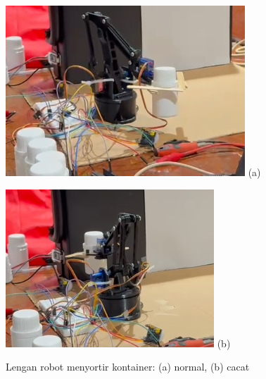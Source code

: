 \begin{figure}[H]
  \centering
  \begin{minipage}[t]{0.48\textwidth}
    \centering
    \includegraphics[width=\textwidth]{gambar/robot_normal.jpeg}
    (a)
  \end{minipage}
  \hfill
  \begin{minipage}[t]{0.48\textwidth}
    \centering
    \includegraphics[width=\textwidth]{gambar/robot_cacat.jpeg}
    (b)
  \end{minipage}
  \caption{Lengan robot menyortir kontainer: (a) normal, (b) cacat}
  \label{fig:robot-only}
  \vspace{-1em}
\end{figure}

